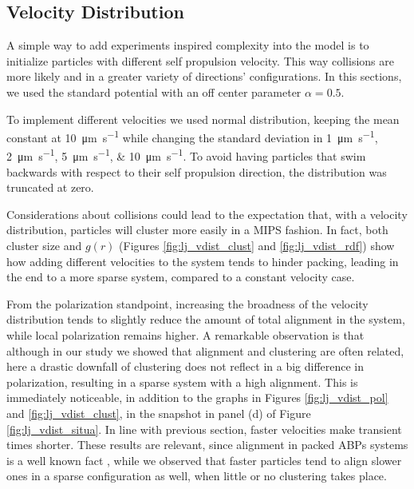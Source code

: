 \documentclass[../../master_thesis_np.tex]{subfiles}
\begin{document}
		\subsection{Velocity Distribution}
		\label{veldist}
		A simple way to add experiments inspired complexity into the model is to initialize particles with different self propulsion velocity. 
		This way collisions are more likely and in a greater variety of directions' configurations.
		In this sections, we used the standard potential with an off center parameter $\alpha = 0.5$.
		
		To implement different velocities we used normal distribution, keeping the mean constant at \SI{10}{\um \per \second} while changing the standard deviation in \qtylist{1; 2; 5; 10}{\um \per \second}.
		To avoid having particles that swim backwards with respect to their self propulsion direction, the distribution was truncated at zero.
		
		Considerations about collisions could lead to the expectation that, with a velocity distribution, particles will cluster more easily in a MIPS fashion.
		In fact, both cluster size and $g(r)$ (Figures \ref{fig:lj_vdist_clust} and \ref{fig:lj_vdist_rdf}) show how adding different velocities to the system tends to hinder packing, leading in the end to a more sparse system, compared to a constant velocity case.
		
		From the polarization standpoint, increasing the broadness of the velocity distribution tends to slightly reduce the amount of total alignment in the system, while local polarization remains higher. 
		A remarkable observation is that although in our study we showed that alignment and clustering are often related, here a drastic downfall of clustering does not reflect in a big difference in polarization, resulting in a sparse system with a high alignment.
		This is immediately noticeable, in addition to the graphs in Figures \ref{fig:lj_vdist_pol} and \ref{fig:lj_vdist_clust}, in the snapshot in panel (d) of Figure \ref{fig:lj_vdist_situa}.
		In line with previous section, faster velocities make transient times shorter.
		These results are relevant, since alignment in packed ABPs systems is a well known fact \cite{caprini_spontaneous_2020}, while we observed that faster particles tend to align slower ones in a sparse configuration as well, when little or no clustering takes place.
		
\end{document}
